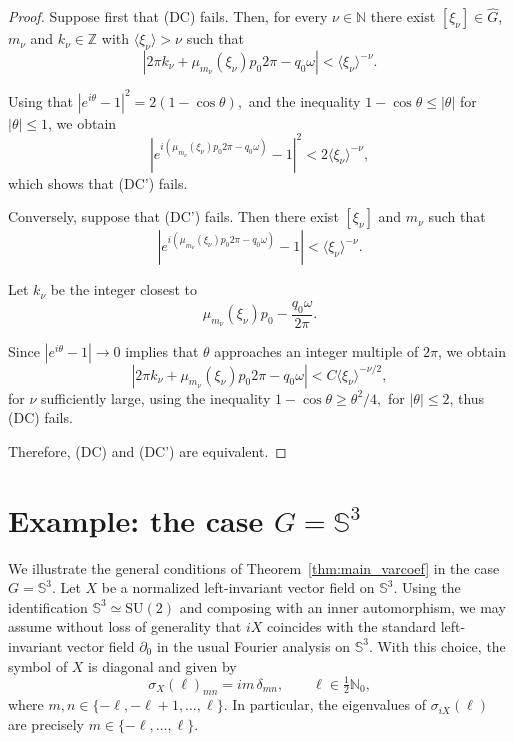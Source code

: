 \documentclass[11pt,reqno]{amsart}
\numberwithin{equation}{section}
\begin{document}
	
	\begin{proof}
		Suppose first that \textup{(DC)} fails. Then, for every $\nu\in\mathbb{N}$ there exist $[\xi_\nu]\in\widehat G$, $m_\nu$ and $k_\nu\in\mathbb{Z}$ with $\langle\xi_\nu\rangle>\nu$ such that
		\[
		|2\pi k_\nu+\mu_{m_\nu}(\xi_\nu)p_0 2\pi-q_0\omega|
		< \langle\xi_\nu\rangle^{-\nu}.
		\]
		
		Using that \(|e^{i\theta}-1|^2=2(1-\cos\theta),\) and the inequality $1-\cos\theta\le |\theta|$ for $|\theta|\le1$, we obtain
		\[
		|e^{i(\mu_{m_\nu}(\xi_\nu)p_0 2\pi-q_0\omega)}-1|^2
		< 2\langle\xi_\nu\rangle^{-\nu},
		\]
		which shows that \textup{(DC')} fails.
		
		\medskip
		
		Conversely, suppose that \textup{(DC')} fails. Then there exist $[\xi_\nu]$ and $m_\nu$ such that
		\[
		|e^{i(\mu_{m_\nu}(\xi_\nu)p_0 2\pi-q_0\omega)}-1|
		< \langle\xi_\nu\rangle^{-\nu}.
		\]
		
		Let $k_\nu$ be the integer closest to
		\[
		\mu_{m_\nu}(\xi_\nu)p_0-\frac{q_0\omega}{2\pi}.
		\]
		
		Since $|e^{i\theta}-1|\to0$ implies that $\theta$ approaches an integer multiple of $2\pi$, we obtain
		\[
		|2\pi k_\nu+\mu_{m_\nu}(\xi_\nu)p_0 2\pi-q_0\omega|
		< C\langle\xi_\nu\rangle^{-\nu/2},
		\]
		for $\nu$ sufficiently large, using the inequality
		\(
		1-\cos\theta\ge \theta^2/4,\) for  \(|\theta|\le2
		\), thus \textup{(DC)} fails.
		
		Therefore, \textup{(DC)} and \textup{(DC')} are equivalent.
	\end{proof}	
	
	\section{Example: the case $G=\mathbb{S}^3$}\label{sec:example}
	
	We illustrate the general conditions of Theorem~\ref{thm:main_varcoef} in the case $G=\mathbb{S}^3$. Let $X$ be a normalized left-invariant vector field on $\mathbb{S}^3$. Using the identification $\mathbb{S}^3\simeq \mathrm{SU}(2)$ and composing with an inner automorphism, we may assume without loss of generality that $iX$ coincides with the standard left-invariant vector field $\partial_0$ in the usual Fourier analysis on $\mathbb{S}^3$. With this choice, the symbol of $X$ is diagonal and given by
	\[
	\sigma_X(\ell)_{mn}= i m\,\delta_{mn},\qquad \ell\in \tfrac12\mathbb{N}_0,
	\]
	where $m,n\in\{-\ell,-\ell+1,\dots,\ell\}$. In particular, the eigenvalues of $\sigma_{iX}(\ell)$ are precisely $m\in\{-\ell,\dots,\ell\}$.
	
\end{document}
